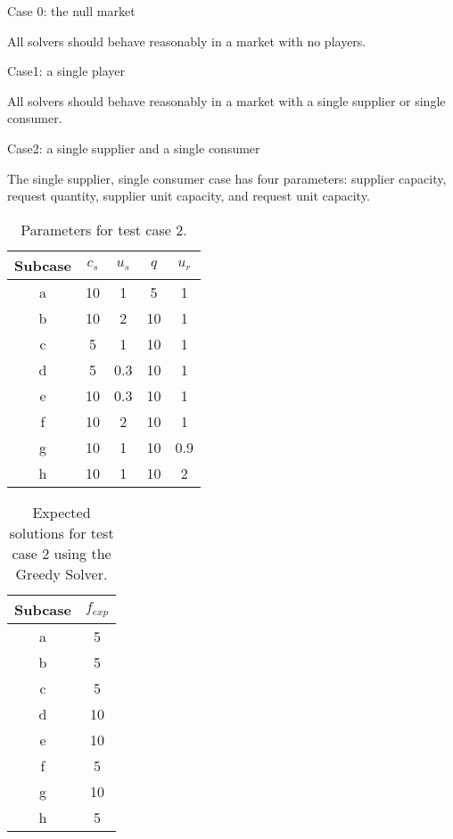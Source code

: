 Case 0: the null market

All solvers should behave reasonably in a market with no players.

Case1: a single player

All solvers should behave reasonably in a market with a single supplier or
single consumer.

Case2: a single supplier and a single consumer

The single supplier, single consumer case has four parameters: supplier
capacity, request quantity, supplier unit capacity, and request unit capacity.

\begin{table}[ht]
  \begin{center}
    \caption{Parameters for test case 2.}
    \begin{tabular}{ccccc}
    \toprule
    Subcase & $c_s$ & $u_s$ & $q$ & $u_r$\\
    \midrule
    a & 10 & 1   & 5  & 1   \\
    b & 10 & 2   & 10 & 1   \\
    c & 5  & 1   & 10 & 1   \\
    d & 5  & 0.3 & 10 & 1   \\
    e & 10 & 0.3 & 10 & 1   \\
    f & 10 & 2   & 10 & 1   \\
    g & 10 & 1   & 10 & 0.9 \\
    h & 10 & 1   & 10 & 2   \\
    \bottomrule
    \end{tabular}
  \end{center}
\end{table}

\begin{table}[ht]
  \begin{center}
    \caption{Expected solutions for test case 2 using the Greedy Solver.}
    \begin{tabular}{cc}
    \toprule
    Subcase & $f_{exp}$\\
    \midrule
    a & 5  \\
    b & 5  \\
    c & 5  \\
    d & 10 \\
    e & 10 \\
    f & 5  \\
    g & 10 \\
    h & 5  \\
    \bottomrule
    \end{tabular}
  \end{center}
\end{table}

